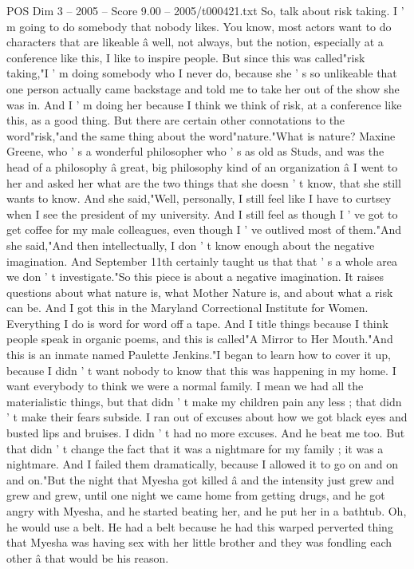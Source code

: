 \begin{textsample}{POS Dim 3 – 2005 – Score 9.00 – 2005/t000421.txt}
So, talk about risk taking.
I ' m going to do somebody that nobody likes.
You know, most actors want to do characters that are likeable â well, not always, but the notion, especially at a conference like this, I like to inspire people.
But since this was called"risk taking,"I ' m doing somebody who I never do, because she ' s so unlikeable that one person actually came backstage and told me to take her out of the show she was in.
And I ' m doing her because I think we think of risk, at a conference like this, as a good thing.
But there are certain other connotations to the word"risk,"and the same thing about the word"nature."What is nature?
Maxine Greene, who ' s a wonderful philosopher who ' s as old as Studs, and was the head of a philosophy â great, big philosophy kind of an organization â I went to her and asked her what are the two things that she doesn ' t know, that she still wants to know.
And she said,"Well, personally, I still feel like I have to curtsey when I see the president of my university.
And I still feel as though I ' ve got to get coffee for my male colleagues, even though I ' ve outlived most of them."And she said,"And then intellectually, I don ' t know enough about the negative imagination.
And September 11th certainly taught us that that ' s a whole area we don ' t investigate."So this piece is about a negative imagination.
It raises questions about what nature is, what Mother Nature is, and about what a risk can be.
And I got this in the Maryland Correctional Institute for Women.
Everything I do is word for word off a tape.
And I title things because I think people speak in organic poems, and this is called"A Mirror to Her Mouth."And this is an inmate named Paulette Jenkins."I began to learn how to cover it up, because I didn ' t want nobody to know that this was happening in my home.
I want everybody to think we were a normal family.
I mean we had all the materialistic things, but that didn ' t make my children pain any less ; that didn ' t make their fears subside.
I ran out of excuses about how we got black eyes and busted lips and bruises.
I didn ' t had no more excuses.
And he beat me too.
But that didn ' t change the fact that it was a nightmare for my family ; it was a nightmare.
And I failed them dramatically, because I allowed it to go on and on and on."But the night that Myesha got killed â and the intensity just grew and grew and grew, until one night we came home from getting drugs, and he got angry with Myesha, and he started beating her, and he put her in a bathtub.
Oh, he would use a belt.
He had a belt because he had this warped perverted thing that Myesha was having sex with her little brother and they was fondling each other â that would be his reason.

\end{textsample}
